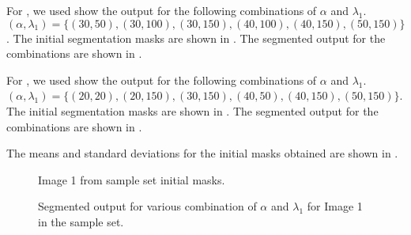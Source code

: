 \begin{definition}
For , we used show the output for the following combinations of $\alpha$ and $\lambda_1$. $(\alpha,\lambda_1) = \{(30,50), (30,100), (30,150), (40,100), (40,150), (50,150)\}$. The initial segmentation masks are shown in . The segmented output for the combinations are shown in .

For , we used show the output for the following combinations of $\alpha$ and $\lambda_1$. $(\alpha,\lambda_1) = \{(20,20), (20,150), (30,150), (40,50), (40,150), (50,150)\}$. The initial segmentation masks are shown in . The segmented output for the combinations are shown in .

The means and standard deviations for the initial masks obtained are shown in .

\clearpage

\begin{figure}[!t]
	\centering
	\caption{Image 1 from sample set  initial masks.}
	\label{fig:image1init}
\end{figure}

\begin{figure}[!t]
	\centering
	\caption{Segmented output for various combination of $\alpha$ and $\lambda_1$ for Image 1 in the sample set.}
	\label{fig:image1mytune}
\end{figure}


\end{definition}
